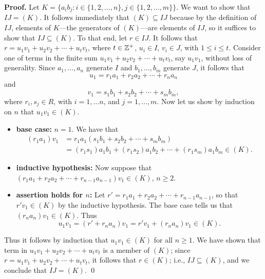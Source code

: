 \begin{enumerate}
      \textbf{Proof.} Let $K = \{a_ib_j : i \in \{1, 2, \ldots, n\},
      j \in\{1, 2, \ldots, m\}\}$. We want to show that $IJ = (K)$. It follows
      immediately that $(K) \subseteq IJ$ because by the definition of $IJ$,
      elements of $K$---the generators of $(K)$---are elements of $IJ$, so it 
      suffices to show that $IJ \subseteq (K)$. To that end, let $r \in IJ$. It 
      follows that $r = u_1v_1 + u_2v_2 + \cdots + u_tv_t$, where $t \in \mathbb{Z}^+$, 
      $u_i \in I$, $v_i \in J$, with $1 \le i \le t$. Consider one of terms in 
      the finite sum $u_1v_1 + u_2v_2 + \cdots + u_tv_t$, say $u_1v_1$, without 
      loss of generality. Since $a_1, \ldots, a_n$ generate $I$ and
      $b_1, \ldots, b_m$ generate $J$, it follows that
      $$u_1 = r_1a_1 + r_2a_2 + \cdots + r_na_n$$
      and
      $$v_1 = s_1b_1 + s_2b_2 + \cdots + s_mb_m,$$
      where $r_i, s_j \in R$, with $i = 1, \ldots n$, and $j = 1, \ldots, m$.
      Now let us show by induction on $n$ that $u_1v_1 \in (K)$.

      \begin{itemize}
         \item \textbf{base case:} $n = 1$. We have that
               \begin{align*}
                  (r_1a_1)v_1 &= r_1a_1(s_1b_1 + s_2b_2 + \cdots + s_mb_m) \\
                     &= (r_1s_1)a_1b_1 + (r_1s_2)a_1b_2 + \cdots +
                        (r_1s_m)a_1b_m \in (K).
               \end{align*}
         \item \textbf{inductive hypothesis:} Now suppose that
               $(r_1a_1 + r_2a_2 + \cdots + r_{n-1}a_{n-1})v_1 \in (K)$,
               $n \ge 2$.
         \item \textbf{assertion holds for $n$:} Let
               $r' = r_1a_1 + r_2a_2 + \cdots + r_{n-1}a_{n-1}$, so that
               $r'v_1 \in (K)$ by the inductive hypothesis. The base case tells
               us that $(r_na_n)v_1 \in (K)$. Thus
               $$u_1v_1 = (r' + r_na_n)v_1 = r'v_1 + (r_na_n)v_1 \in (K).$$
      \end{itemize}
      Thus it follows by induction that $u_1v_1 \in (K)$ for all $n \ge 1$. We
      have shown that term in $u_1v_1 + u_2v_2 + \cdots + u_tv_t$ is a member of
      $(K)$; since $r = u_1v_1 + u_2v_2 + \cdots + u_tv_t$, it follows that
      $r \in (K)$; i.e., $IJ \subseteq (K)$, and we conclude that $IJ = (K)$.
      \qed
      

\end{enumerate}
